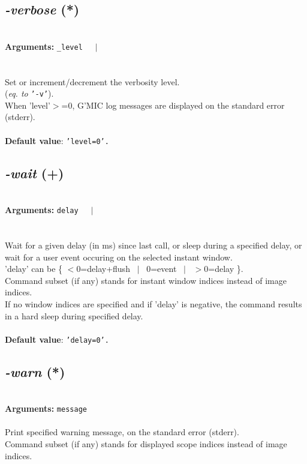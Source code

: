 \documentclass[a4paper,11pt,twoside]{book}
\begin{document}
\subsection{\emph{-verbose} (*)}\vspace*{-0.5em}
~\\\textbf{Arguments: } 
{\small \texttt{\_level}}~~~$|$\\
\hspace*{2.2cm}{\small \texttt{\{ + ~$|$~ - \}}}\\~\\
Set or increment/decrement the verbosity level.
~\\(\emph{eq. to} {\small \texttt{'-v'}}).
~\\When 'level'$>$=0, G'MIC log messages are displayed on the standard error (stderr).
~\\~\\\textbf{Default value}: {\small \texttt{'level=0'.}}


\subsection{\emph{-wait} (+)}\vspace*{-0.5em}
~\\\textbf{Arguments: } 
{\small \texttt{delay}}~~~$|$\\
\\~\\
Wait for a given delay (in ms) since last call, or sleep during a specified delay,
or wait for a user event occuring on the selected instant window.
~\\'delay' can be \{ $<$0=delay+flush ~$|$~ 0=event ~$|$~ $>$0=delay \}.
~\\Command subset (if any) stands for instant window indices instead of image indices.
~\\If no window indices are specified and if 'delay' is negative, the command results
in a hard sleep during specified delay.
~\\~\\\textbf{Default value}: {\small \texttt{'delay=0'.}}


\subsection{\emph{-warn} (*)}\vspace*{-0.5em}
~\\\textbf{Arguments: } 
{\small \texttt{message}}\\~\\
Print specified warning message, on the standard error (stderr).
~\\Command subset (if any) stands for displayed scope indices instead of image indices.
\end{document}
